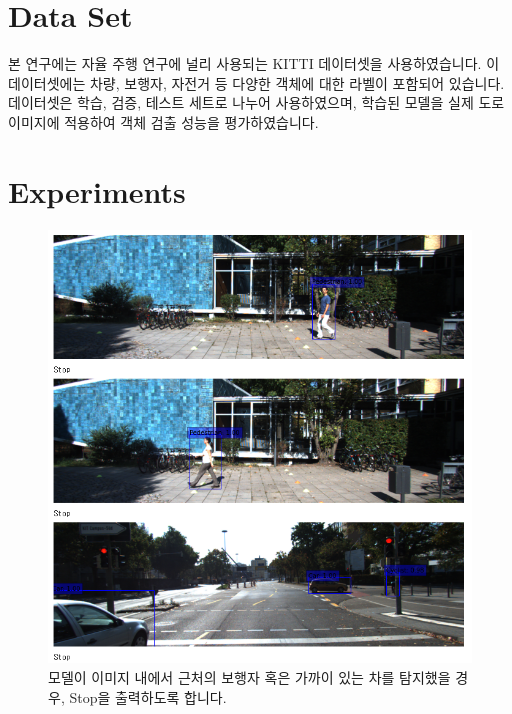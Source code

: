 \documentclass[12pt]{article}
\begin{document}
\section{Data Set}
본 연구에는 자율 주행 연구에 널리 사용되는 KITTI 데이터셋을 사용하였습니다. 이 데이터셋에는 차량, 보행자, 자전거 등 다양한 객체에 대한 라벨이 포함되어 있습니다. 데이터셋은 학습, 검증, 테스트 세트로 나누어 사용하였으며, 학습된 모델을 실제 도로 이미지에 적용하여 객체 검출 성능을 평가하였습니다. 

\section{Experiments}
\begin{figure}[h!]
    \centering
    \begin{minipage}{0.45\linewidth}
        \centering
        \includegraphics[width=\linewidth]{result1.png}
        \caption{모델이 이미지 내에서 근처의 보행자 혹은 가까이 있는 차를 탐지했을 경우, Stop을 출력하도록 합니다.}
        \label{fig:result1}
    \end{minipage}
    \hspace{0.05\linewidth} %
    \begin{minipage}{0.45\linewidth}
        \centering

\end{minipage}
\end{figure}
\end{document}
